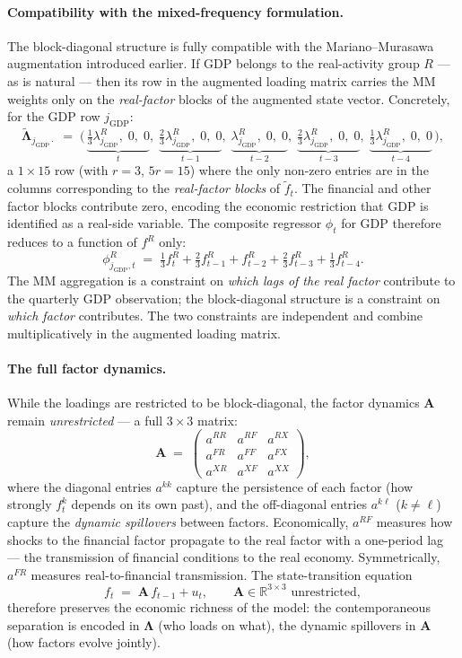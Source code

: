 \documentclass[11pt, a4paper, oneside]{article}
\newcommand{\mL}{\boldsymbol{\Lambda}}
\begin{document}
\paragraph{Compatibility with the mixed-frequency formulation.}
The block-diagonal structure is fully compatible with the
Mariano--Murasawa augmentation introduced earlier. If GDP belongs to
the real-activity group $R$ — as is natural — then its row in the
augmented loading matrix carries the MM weights only on the
\emph{real-factor} blocks of the augmented state vector. Concretely,
for the GDP row $j_{\text{GDP}}$:
\[
\tilde{\mL}_{j_{\text{GDP}}\cdot} \;=\;
\Big(\,
\underbrace{\tfrac{1}{3}\lambda^R_{j_{\text{GDP}}},\; 0,\; 0}_{t},\;
\underbrace{\tfrac{2}{3}\lambda^R_{j_{\text{GDP}}},\; 0,\; 0}_{t-1},\;
\underbrace{\lambda^R_{j_{\text{GDP}}},\; 0,\; 0}_{t-2},\;
\underbrace{\tfrac{2}{3}\lambda^R_{j_{\text{GDP}}},\; 0,\; 0}_{t-3},\;
\underbrace{\tfrac{1}{3}\lambda^R_{j_{\text{GDP}}},\; 0,\; 0}_{t-4}
\,\Big),
\]
a $1 \times 15$ row (with $r = 3$, $5r = 15$) where the only
non-zero entries are in the columns corresponding to the
\emph{real-factor blocks} of $\tilde{f}_t$. The financial and other
factor blocks contribute zero, encoding the economic restriction that
GDP is identified as a real-side variable. The composite regressor
$\phi_t$ for GDP therefore reduces to a function of $f^R$ only:
\[
\phi^R_{j_{\text{GDP}}, t} \;=\; \tfrac{1}{3} f^R_t + \tfrac{2}{3} f^R_{t-1} + f^R_{t-2} + \tfrac{2}{3} f^R_{t-3} + \tfrac{1}{3} f^R_{t-4}.
\]
The MM aggregation is a constraint on \emph{which lags of the
real factor} contribute to the quarterly GDP observation; the
block-diagonal structure is a constraint on \emph{which factor}
contributes. The two constraints are independent and combine
multiplicatively in the augmented loading matrix.

\paragraph{The full factor dynamics.}
While the loadings are restricted to be block-diagonal, the factor
dynamics $\mathbf{A}$ remain \emph{unrestricted} — a full $3 \times 3$
matrix:
\[
\mathbf{A} \;=\; \begin{pmatrix}
a^{RR} & a^{RF} & a^{RX} \\
a^{FR} & a^{FF} & a^{FX} \\
a^{XR} & a^{XF} & a^{XX}
\end{pmatrix},
\]
where the diagonal entries $a^{kk}$ capture the persistence of each
factor (how strongly $f^k_t$ depends on its own past), and the
off-diagonal entries $a^{k\ell}$ ($k \neq \ell$) capture the
\emph{dynamic spillovers} between factors. Economically, $a^{RF}$
measures how shocks to the financial factor propagate to the real
factor with a one-period lag — the transmission of financial
conditions to the real economy. Symmetrically, $a^{FR}$ measures
real-to-financial transmission. The state-transition equation
\[
f_t \;=\; \mathbf{A}\, f_{t-1} + u_t, \qquad \mathbf{A} \in \mathbb{R}^{3 \times 3} \text{ unrestricted},
\]
therefore preserves the economic richness of the model: the
contemporaneous separation is encoded in $\mL$ (who loads on what),
the dynamic spillovers in $\mathbf{A}$ (how factors evolve jointly).
\end{document}
